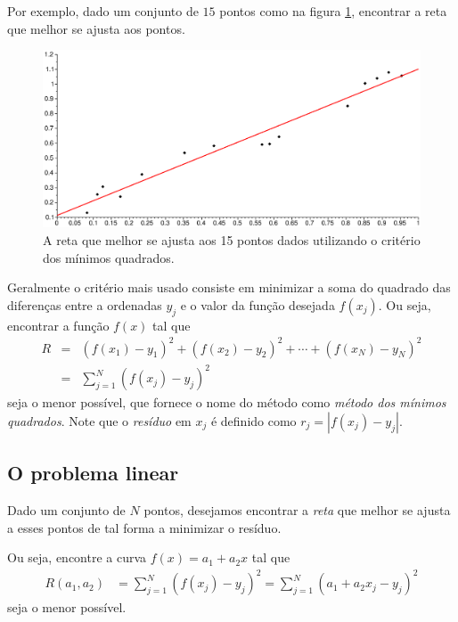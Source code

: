 Por exemplo, dado um conjunto de $15$ pontos como na figura \ref{minquad}, encontrar a reta que melhor se ajusta aos pontos.
\begin{figure}[htp]
\begin{center}
\includegraphics[width=15cm,angle=0]{./cap_aproxfun/pics/ajuste_reta.eps}
\caption{A reta que melhor se ajusta aos 15 pontos dados utilizando o critério dos mínimos quadrados.}
\label{minquad}
\end{center}
\end{figure}

Geralmente o critério mais usado consiste em minimizar a soma do quadrado das diferenças entre a ordenadas $y_j$ e o valor da função desejada $f(x_j)$. Ou seja, encontrar a  função $f(x)$ tal que 
\begin{eqnarray*}
  R &=&(f(x_1)-y_1)^2+(f(x_2)-y_2)^2+\cdots +(f(x_N)-y_N)^2\\
    &=&\sum_{j=1}^N (f(x_j)-y_j)^2
\end{eqnarray*}
seja o menor possível, que fornece o nome do método como \emph{método dos mínimos quadrados}.  Note que o \emph{resíduo} em $x_j$ é definido como $r_j=|f(x_j)-y_j|$. 




\subsection{O problema linear}

Dado um conjunto de $N$ pontos, desejamos encontrar a \textit{reta} que melhor se ajusta a esses pontos de tal forma a minimizar o resíduo.

Ou seja, encontre a curva $f(x)=a_1+a_2 x$ tal que 
\begin{eqnarray*}
  R(a_1,a_2) &=\sum_{j=1}^N (f(x_j)-y_j)^2 = \sum_{j=1}^N (a_1 + a_2 x_j-y_j)^2
\end{eqnarray*}
seja o menor possível.

